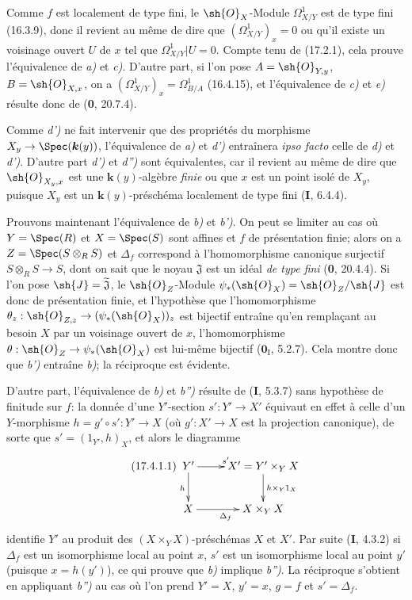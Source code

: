 Comme $f$ est localement de type fini, le $\sh{O}_X$-Module $\varOmega^1_{X/Y}$ est de type fini (16.3.9), donc il revient au même de dire que $(\varOmega^1_{X/Y})_x=0$ ou qu'il existe un voisinage ouvert $U$ de $x$ tel que $\varOmega^1_{X/Y}|U=0$. Compte tenu de (17.2.1), cela prouve l'équivalence de \emph{a)} et \emph{c)}. D'autre part, si l'on pose $A=\sh{O}_{Y,y}$, $B=\sh{O}_{X,x}$, on a $(\varOmega^1_{X/Y})_x=\Omega^1_{B/A}$ (16.4.15), et l'équivalence de \emph{c)} et \emph{e)} résulte donc de (\textbf{0}, 20.7.4).

Comme \emph{d')} ne fait intervenir que des propriétés du morphisme $X_y\to\Spec(\boldsymbol{k}(y))$, l'équivalence de \emph{a)} et \emph{d')} entraînera \emph{ipso facto} celle de \emph{d)} et \emph{d')}. D'autre part \emph{d')} et \emph{d'')} sont équivalentes, car il revient au même de dire que $\sh{O}_{X_y,x}$ est une $\boldsymbol{k}(y)$-algèbre \emph{finie} ou que $x$ est un point isolé de $X_y$, puisque $X_y$ est un $\boldsymbol{k}(y)$-préschéma localement de type fini (\textbf{I}, 6.4.4).

Prouvons maintenant l'équivalence de \emph{b)} et \emph{b')}. On peut se limiter au cas où $Y=\Spec(R)$ et $X=\Spec(S)$ sont affines et $f$ de présentation finie; alors on a $Z=\Spec(S\otimes_R S)$ et $\Delta_f$ correspond à l'homomorphisme canonique surjectif $S\otimes_R S\to S$, dont on sait que le noyau $\mathfrak{J}$ est un idéal \emph{de type fini} (\textbf{0}, 20.4.4). Si l'on pose $\sh{J}=\widetilde{\mathfrak{J}}$, le $\sh{O}_Z$-Module $\psi_*(\sh{O}_X)=\sh{O}_Z/\sh{J}$ est donc de présentation finie, et l'hypothèse que l'homomorphisme $\theta_z: \sh{O}_{Z,z}\to(\psi_*(\sh{O}_X))_z$ est bijectif entraîne qu'en remplaçant au besoin $X$ par un voisinage ouvert de $x$, l'homomorphisme $\theta:\sh{O}_Z\to\psi_*(\sh{O}_X)$ est lui-même bijectif ($\mathbf{0}_{\mathrm I}$, 5.2.7). Cela montre donc que \emph{b')} entraîne \emph{b)}; la réciproque est évidente.

D'autre part, l'équivalence de \emph{b)} et \emph{b'')} résulte de (\textbf{I}, 5.3.7) sans hypothèse de finitude sur $f$: la donnée d'une $Y'$-section $s':Y'\to X'$ équivaut en effet à celle d'un
$Y$-morphisme $h=g'\circ s':Y'\to X$ (où $g':X'\to X$ est la projection canonique), de sorte que $s'=(1_{Y'},h)_X$, et alors le diagramme
\[
\tag{17.4.1.1}
\label{IV.17.4.1.1}
\xymatrix{
Y' \ar[r]^{s'} \ar[d]_h & X'=Y'\times_Y X \ar[d]^{h\times_Y 1_X}\\
X \ar[r]_{\Delta_f} & X\times_Y X
}
\]
identifie $Y'$ au produit des $(X\times_Y X)$-préschémas $X$ et $X'$. Par suite (\textbf{I}, 4.3.2) si $\Delta_f$ est un isomorphisme local au point $x$, $s'$ est un isomorphisme local au point $y'$ (puisque $x=h(y')$), ce qui prouve que \emph{b)} implique \emph{b'')}. La réciproque s'obtient en appliquant \emph{b'')} au cas où l'on prend $Y'=X$, $y'=x$, $g=f$ et $s'=\Delta_f$.

